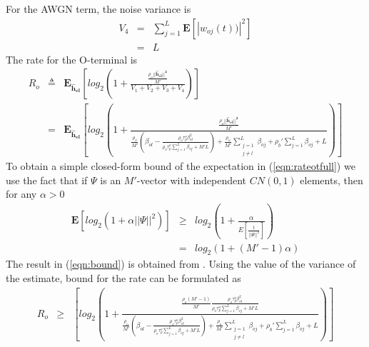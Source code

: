 \documentclass[10pt, a4paper, twoside,fleqn]{article}
\begin{document}
For the AWGN term, the noise variance is 
\begin{eqnarray}
	V_4 &=& \sum\limits_{j=1}^{L}\mathbf{E}[|w_{oj}(t))|^2] \nonumber \\
            &=& L
\end{eqnarray}
The rate for the O-terminal is
\begin{eqnarray}\label{eqn:rateotfull}
	R_o &\triangleq& \mathbf{E_{\hat h_{el}}}\left[log_2\left(1+\frac{\frac{\rho_o||\mathbf{\hat h_{el}||^2}}{M'}}{V_1+V_2+V_3+V_4}\right) \right] \nonumber \\
            &=&  \mathbf{E_{\hat h_{el}}}\left[log_2\left(1+\frac{\frac{\rho_o||\mathbf{\hat h_{el}||^2}}{M'}}
								 {\frac{\rho_o}{M'}(\beta_{ol}-\frac{\rho_o\tau_p^o\beta^2_{ol}}{\rho_o\tau_p^o\sum_{j=1}^{L}\beta_{oj}+M'L})        
								  + \frac{\rho_o}{M'} \sum_{\substack{j=1 \\ j\neq l}}^{L} \beta_{oj} 
								  +\rho_b'\sum_{j=1}^{L}\beta_{oj}
								  +L}\right) \right]	
\end{eqnarray}
To obtain a simple closed-form bound of the expectation in (\ref{eqn:rateotfull}) we use the fact that if $\Psi$ is an $M'$-vector with independent $CN(0,1)$ elements, then for any $\alpha>0$
\begin{eqnarray}\label{eqn:bound}
	\mathbf{E}[log_2(1+\alpha||\Psi||^2)] &\geq& log_2\left(1+\frac{\alpha}{E[\frac{1}{||\Psi||^2}]}\right) \nonumber \\
                                              &=&  log_2(1+(M'-1)\alpha)
\end{eqnarray}
The result in (\ref{eqn:bound}) is obtained from \cite{bib:dtsysBook}. Using the value of the variance of the estimate, bound for the rate can be formulated as
\begin{eqnarray}
	R_o &\geq& \left[log_2\left(1+\frac{\frac{\rho_o(M'-1)}{M'}\frac{\rho_o\tau_p^o\beta^2_{ol}}{\rho_o\tau_p^o\sum_{j=1}^{L}\beta_{oj}+M'L}}
								 {\frac{\rho_o}{M'}(\beta_{ol}-\frac{\rho_o\tau_p^o\beta^2_{ol}}{\rho_o\tau_p^o\sum_{j=1}^{L}\beta_{oj}+M'L})        
								  + \frac{\rho_o}{M'} \sum_{\substack{j=1 \\ j\neq l}}^{L} \beta_{oj} 
								  +\rho_b'\sum_{j=1}^{L}\beta_{oj}
								  +L}\right) \right]	
\end{eqnarray}
\end{document}
